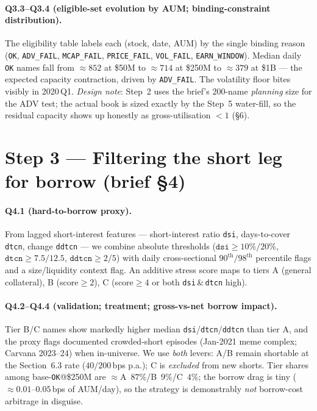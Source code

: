 \documentclass[11pt,a4paper]{article}
\newcommand{\code}[1]{\texttt{#1}}
\begin{document}
\paragraph{Q3.3--Q3.4 (eligible-set evolution by AUM; binding-constraint distribution).} The eligibility table
labels each (stock, date, AUM) by the single binding reason (\code{OK}, \code{ADV\_FAIL}, \code{MCAP\_FAIL},
\code{PRICE\_FAIL}, \code{VOL\_FAIL}, \code{EARN\_WINDOW}). Median daily \code{OK} names fall from $\approx852$
at \$50M to $\approx714$ at \$250M to $\approx379$ at \$1B --- the expected capacity contraction, driven by
\code{ADV\_FAIL}. The volatility floor bites visibly in 2020\,Q1. \emph{Design note}: Step~2 uses the brief's
$200$-name \emph{planning} size for the ADV test; the actual book is sized exactly by the Step~5 water-fill, so
the residual capacity shows up honestly as gross-utilisation $<1$ (\S6).

\section{Step 3 --- Filtering the short leg for borrow (brief §4)}

\paragraph{Q4.1 (hard-to-borrow proxy).} From lagged short-interest features --- short-interest ratio
\code{dsi}, days-to-cover \code{dtcn}, change \code{ddtcn} --- we combine absolute thresholds
($\code{dsi}\ge10\%/20\%$, $\code{dtcn}\ge7.5/12.5$, $\code{ddtcn}\ge2/5$) with daily cross-sectional
$90^{\text{th}}/98^{\text{th}}$ percentile flags and a size/liquidity context flag. An additive stress score
maps to tiers A (general collateral), B (score$\ge2$), C (score$\ge4$ or both \code{dsi}\,\&\,\code{dtcn} high).

\paragraph{Q4.2--Q4.4 (validation; treatment; gross-vs-net borrow impact).} Tier B/C names show markedly higher
median \code{dsi}/\code{dtcn}/\code{ddtcn} than tier A, and the proxy flags documented crowded-short episodes
(Jan-2021 meme complex; Carvana 2023--24) when in-universe. We use \emph{both} levers: A/B remain shortable at
the Section~6.3 rate ($40/200$\,bps p.a.); C is \emph{excluded} from new shorts. Tier shares among
base-\code{OK}@\$250M are $\approx$A~$87\%$/B~$9\%$/C~$4\%$; the borrow drag is tiny ($\approx0.01$--$0.05$\,bps
of AUM/day), so the strategy is demonstrably \emph{not} borrow-cost arbitrage in disguise.
\end{document}
